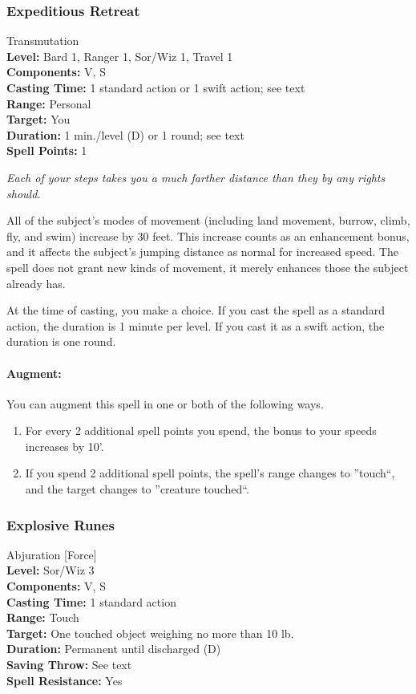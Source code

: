 \subsubsection{Expeditious Retreat}
\label{Spell:ExpeditiousRetreat}
Transmutation
\\ \textbf{Level:} Bard 1, Ranger 1, Sor/Wiz 1, Travel 1
\\ \textbf{Components:} V, S
\\ \textbf{Casting Time:} 1 standard action or 1 swift action; see text
\\ \textbf{Range:} Personal
\\ \textbf{Target:} You
\\ \textbf{Duration:} 1 min./level (D) or 1 round; see text
\\ \textbf{Spell Points:} 1

\emph{Each of your steps takes you a much farther distance than they by any rights should.}

All of the subject's modes of movement (including land movement, burrow, climb, fly, and swim) increase by 30 feet. This increase counts as an enhancement bonus, and it affects the subject's jumping distance as normal for increased speed. The spell does not grant new kinds of movement, it merely enhances those the subject already has.

At the time of casting, you make a choice. If you cast the spell as a standard action, the duration is 1 minute per level. 
If you cast it as a swift action, the duration is one round.

\paragraph{Augment:}  You can augment this spell in one or both of the following ways.
\begin{enumerate}
 \item For every 2 additional spell points you spend, the bonus to your speeds increases by 10'.
 \item If you spend 2 additional spell points, the spell's range changes to ''touch``, and the target changes to ''creature touched``. 
\end{enumerate}
\subsubsection{Explosive Runes}
\label{Spell:ExplosiveRunes}
Abjuration [Force]
\\ \textbf{Level:} Sor/Wiz 3
\\ \textbf{Components:} V, S
\\ \textbf{Casting Time:} 1 standard action
\\ \textbf{Range:} Touch
\\ \textbf{Target:} One touched object weighing no more than 10 lb.
\\ \textbf{Duration:} Permanent until discharged (D)
\\ \textbf{Saving Throw:} See text
\\ \textbf{Spell Resistance:} Yes

